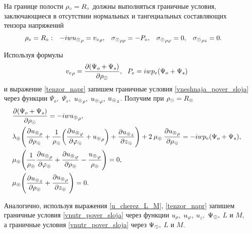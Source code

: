 На границе полости $\rho_\circ=R_\circ$ должны выполняться граничные условия, заключающиеся в отсутствии нормальных и тангециальных составляющих тензора напряжений
\begin{equation}\label{gran_pol}
\begin{aligned}
\rho_\circ &=R_\circ: &-iw{u_\odot}_{\rho}&={v_\circ}_{\rho}, &{\sigma_\odot}_{\rho\rho}&=-P_\circ, &{\sigma_\odot}_{\rho\varphi}&=0, &{\sigma_\odot}_{\rho z}&=0.
\end{aligned}
\end{equation}

Используя формулы
$${v_e}_{\rho}=\frac{\partial(\Psi_{o}+\Psi_s)}{\partial\rho_\odot},\:\:\: P_e=iwp_e(\Psi_{o}+\Psi_s)$$
и выражение \eqref{tenzor_napr} запишем граничные условия \eqref{vneshnaja_pover_sloja} через функции $\Psi_{o},$ $\Psi_s,$ ${u_\circledcirc}_\rho,$ ${u_\circledcirc}_\varphi,$ ${u_\circledcirc}_z$. Получим при $\rho_\odot=R_\circledcirc$
\begin{align}
&\frac{\partial(\Psi_{o}+\Psi_s)}{\partial\rho_\odot}=-iw{u_\circledcirc}_{\rho},\\
&\lambda_\circledcirc\Biggl(\frac{\partial {u_\circledcirc}_{\rho}}{\partial \rho_\circledcirc}+\frac{1}{\rho_\circledcirc}\biggl(\frac{\partial {u_\circledcirc}_\varphi}{\partial\varphi_\circledcirc}+{u_\circledcirc}_{\rho}\biggr)+\frac{\partial {u_\circledcirc}_z}{\partial z_\circledcirc}\Biggr)+2\:\mu_\circledcirc\:\frac{\partial {u_\circledcirc}_{\rho}}{\partial \rho_\circledcirc}=-iwp_e(\Psi_{o}+\Psi_s),\\
&\mu_\circledcirc\Biggl(\frac{1}{\rho_\circledcirc}\frac{\partial {u_\circledcirc}_{\rho}}{\partial\varphi_\circledcirc}+\frac{\partial {u_\circledcirc}_{\varphi}}{\partial \rho_\circledcirc}-\frac{{u_\circledcirc}_{\varphi}}{\rho_\circledcirc}\Biggr)=0,\\
&\mu_\circledcirc\Biggl(\frac{\partial {u_\circledcirc}_z}{\partial \rho_\circledcirc}+\frac{\partial {u_\circledcirc}_{\rho}}{\partial z_\circledcirc}\Biggr)=0.\\
\end{align}

Аналогично, используя выражения \eqref{u_cherez_L_M}, \eqref{tenzor_napr} запишем граничные условия \eqref{vnutr_pover_sloja} через функции $u_\rho,$ $u_\varphi,$ $u_z,$ $ \Psi_\odot,$ $L$ и $M ,$ а граничные условия \eqref{vnutr_pover_sloja} через $\Psi_\odot,$ $L$ и $M.$

